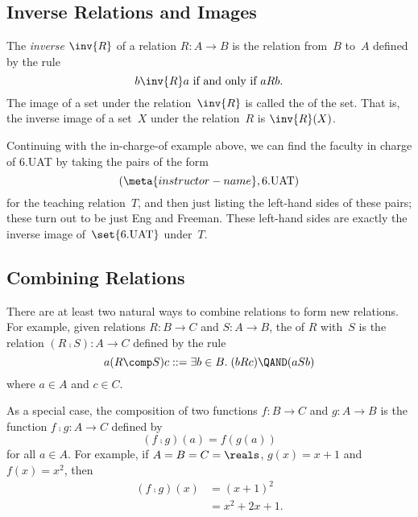 \subsection{Inverse Relations and Images}

\begin{definition}\label{def:inverse}
The \emph{inverse} $\inv{R}$ of a relation $R: A \to B$ is the
relation from~$B$ to~$A$ defined by the rule
\begin{equation*}
    b \inv{R} a \text{ if and only if } a R b.
\end{equation*}
The image of a set under the relation~$\inv{R}$ is called the
 of the set.  That is, the inverse image of a
set~$X$ under the relation~$R$ is $\inv{R}(X)$.
\end{definition}

Continuing with the in-charge-of example above, we can find the
faculty in charge of 6.UAT by taking the pairs of the form
\begin{equation*}
    (\meta{instructor-name}, \text{6.UAT})
\end{equation*}
for the teaching relation~$T$, and then just listing the left-hand
sides of these pairs; these turn out to be just Eng and Freeman.
These left-hand sides are exactly the inverse image
of~$\set{\text{6.UAT}}$ under~$T$.

\subsection{Combining Relations}\label{subsec:combine-rel}

There are at least two natural ways to combine relations to form new
relations.  For example, given relations $R : B \to C$ and $S : A \to
B$, the  of $R$ with~$S$ is the relation $(R \comp
S) : A \to C$ defined by the rule
\begin{equation*}
    a (R \comp S) c ::= \exists b \in B. \; (b R c) \QAND (a S b)
\end{equation*}
where $a \in A$ and $c \in C$.

As a special case, the composition of two functions $f: B \to C$ and
$g: A \to B$ is the function $f \comp g : A \to C$ defined by
\begin{equation*}
    (f \comp g)(a) = f(g(a))
\end{equation*}
for all $a \in A$.  For example, if $A = B = C = \reals$, $g(x) = x +
1$ and $f(x) = x^2$, then
\begin{align*}
    (f \comp g)(x) &= (x + 1)^2 \\
                   &= x^2 + 2x + 1.
\end{align*}

